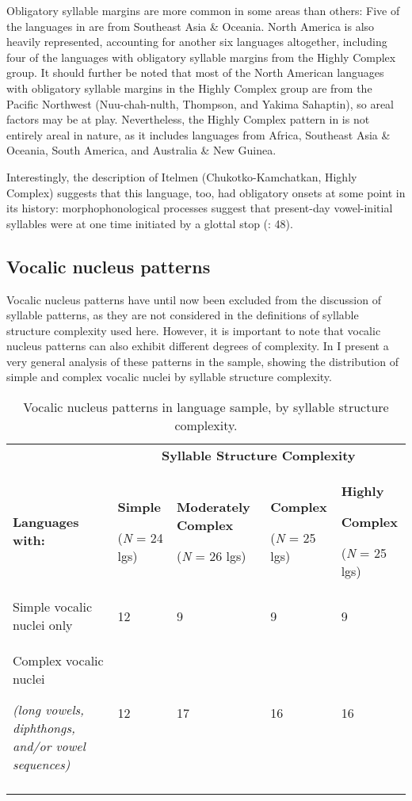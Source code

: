   Obligatory syllable margins are more common in some areas than others: Five of the languages in  are from Southeast Asia \& Oceania. North America is also heavily represented, accounting for another six languages altogether, including four of the languages with obligatory syllable margins from the Highly Complex group. It should further be noted that most of the North American languages with obligatory syllable margins in the Highly Complex group are from the Pacific Northwest (Nuu-chah-nulth, Thompson, and Yakima Sahaptin), so areal factors may be at play. Nevertheless, the Highly Complex pattern in  is not entirely areal in nature, as it includes languages from Africa, Southeast Asia \& Oceania, South America, and Australia \& New Guinea. 

  Interestingly, the description of Itelmen (Chukotko-Kamchatkan, Highly Complex) suggests that this language, too, had obligatory onsets at some point in its history: morphophonological processes suggest that present-day vowel-initial syllables were at one time initiated by a glottal stop (\citealt{GeorgVolodin1999}: 48).

\subsection{Vocalic nucleus patterns}\label{sec:3.3.4}

  Vocalic nucleus patterns have until now been excluded from the discussion of syllable patterns, as they are not considered in the definitions of syllable structure complexity used here. However, it is important to note that vocalic nucleus patterns can also exhibit different degrees of complexity. In  I present a very general analysis of these patterns in the sample, showing the distribution of simple and complex vocalic nuclei by syllable structure complexity.

\begin{table}
\begin{tabularx}{\textwidth}{XXXXX}
 & \multicolumn{4}{c}{ \textbf{Syllable Structure Complexity}}\\
\lsptoprule
 \textbf{Languages with:} & { \textbf{Simple}}

 (\textit{N} = 24 lgs) & { \textbf{Moderately Complex}}

 (\textit{N} = 26 lgs) & { \textbf{Complex}}

 (\textit{N} = 25 lgs) & { \textbf{Highly} }

{ \textbf{Complex}}

 (\textit{N} = 25 lgs)\\
 Simple vocalic nuclei only & 12 & 9 & 9 & 9\\
{ Complex vocalic nuclei} 

 \textit{(long vowels, diphthongs, and/or vowel sequences)} & 12 & 17 & 16 & 16\\
\lspbottomrule
\end{tabularx}
\caption{\label{tab:3.5}Vocalic nucleus patterns in language sample, by syllable structure complexity.}
\end{table}

